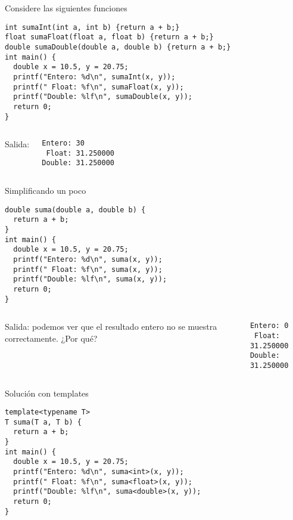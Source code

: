 \documentclass[aspectratio=169]{beamer}
\begin{document}
\begin{frame}[fragile]{Considere las siguientes funciones}
  \begin{lstlisting}
int sumaInt(int a, int b) {return a + b;}
float sumaFloat(float a, float b) {return a + b;}
double sumaDouble(double a, double b) {return a + b;}
int main() {
  double x = 10.5, y = 20.75;
  printf("Entero: %d\n", sumaInt(x, y));
  printf(" Float: %f\n", sumaFloat(x, y));
  printf("Double: %lf\n", sumaDouble(x, y));
  return 0;
}
  \end{lstlisting}
\begin{columns}
  Salida:
  \begin{block}{}
  \begin{verbatim}
Entero: 30
 Float: 31.250000
Double: 31.250000
\end{verbatim}
  \end{block}
\end{columns}
\end{frame}

\begin{frame}[fragile]{Simplificando un poco}
  \begin{lstlisting}
double suma(double a, double b) {
  return a + b;
}
int main() {
  double x = 10.5, y = 20.75;
  printf("Entero: %d\n", suma(x, y));
  printf(" Float: %f\n", suma(x, y));
  printf("Double: %lf\n", suma(x, y));
  return 0;
}
  \end{lstlisting}
\begin{columns}
  Salida: podemos ver que el resultado entero no se muestra correctamente. ¿Por qué?
  \begin{block}{}
  \begin{verbatim}
Entero: 0
 Float: 31.250000
Double: 31.250000
\end{verbatim}
  \end{block}
\end{columns}
\end{frame}

\begin{frame}[fragile]{Solución con templates}
  \begin{lstlisting}
template<typename T>
T suma(T a, T b) {
  return a + b;
}
int main() {
  double x = 10.5, y = 20.75;
  printf("Entero: %d\n", suma<int>(x, y));
  printf(" Float: %f\n", suma<float>(x, y));
  printf("Double: %lf\n", suma<double>(x, y));
  return 0;
}
  \end{lstlisting}
\end{frame}
\end{document}
